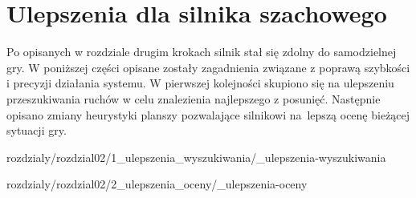 \chapter{Ulepszenia dla silnika szachowego}
\label{ch:implementacja-silnika-szachowego}

Po opisanych w rozdziale drugim krokach silnik stał się zdolny do samodzielnej gry.
W poniższej części opisane zostały zagadnienia związane z poprawą szybkości i precyzji działania systemu.
W pierwszej kolejności skupiono się na ulepszeniu przeszukiwania ruchów w celu znalezienia najlepszego z posunięć.
Następnie opisano zmiany heurystyki planszy pozwalające silnikowi na~lepszą ocenę bieżącej sytuacji gry.

 {rozdzialy/rozdzial02/1_ulepszenia_wyszukiwania/_ulepszenia-wyszukiwania}

 {rozdzialy/rozdzial02/2_ulepszenia_oceny/_ulepszenia-oceny}

